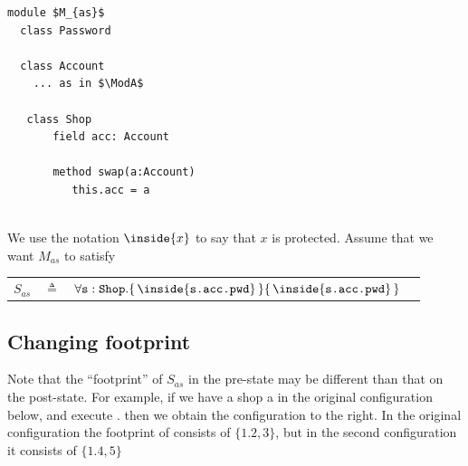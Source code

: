 \begin{lstlisting}[mathescape=true, language=Chainmail, frame=lines]
module $M_{as}$        
  class Password
  
  class Account
    ... as in $\ModA$
    
   class Shop
       field acc: Account
       
       method swap(a:Account)
          this.acc = a
    
\end{lstlisting}
%
  
We use the notation ${\inside{x}}$ to say that $x$ is protected. Assume that we want $M_{as}$   to satisfy

 \begin{tabular}{lcll}
 $S_{as}$   & $\triangleq$   &  $\TwoStatesQ {\prg{s}:\prg{Shop}}  {\inside{\prg{s.acc.pwd}}}  {\inside{\prg{s.acc.pwd}}}$
 \end{tabular}
  
\subsection{Changing footprint}  

Note that the ``footprint'' of $S_{as}$ in the pre-state may be different than that on the post-state. For example, if we have a shop a in the original configuration below,  and execute . then we obtain the configuration to the right. In the original configuration the footprint of  consists of $\{ 1. 2, 3\}$, but in the second configuration it consists of $\{ 1. 4, 5\}$
  
